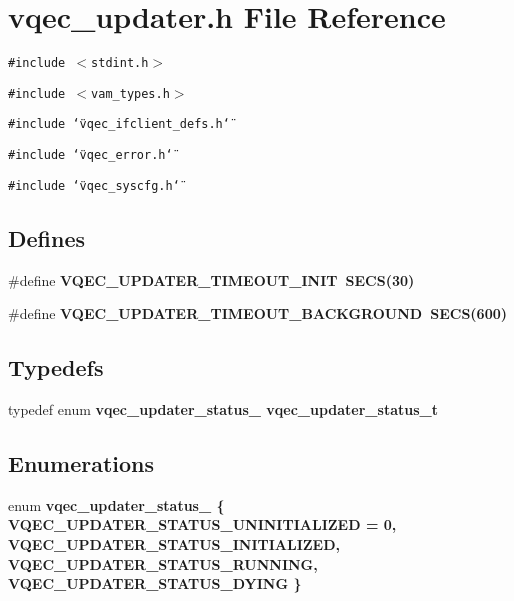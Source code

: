 \section{vqec\_\-updater.h File Reference}
\label{vqec__updater_8h}
{\tt \#include $<$stdint.h$>$}\par
{\tt \#include $<$vam\_\-types.h$>$}\par
{\tt \#include \char`\"{}vqec\_\-ifclient\_\-defs.h\char`\"{}}\par
{\tt \#include \char`\"{}vqec\_\-error.h\char`\"{}}\par
{\tt \#include \char`\"{}vqec\_\-syscfg.h\char`\"{}}\par
\subsection*{Defines}
\begin{CompactItemize}
\item 
\#define \bf{VQEC\_\-UPDATER\_\-TIMEOUT\_\-INIT}~SECS(30)
\item 
\#define \bf{VQEC\_\-UPDATER\_\-TIMEOUT\_\-BACKGROUND}~SECS(600)
\end{CompactItemize}
\subsection*{Typedefs}
\begin{CompactItemize}
\item 
typedef enum \bf{vqec\_\-updater\_\-status\_\-} \bf{vqec\_\-updater\_\-status\_\-t}
\end{CompactItemize}
\subsection*{Enumerations}
\begin{CompactItemize}
\item 
enum \bf{vqec\_\-updater\_\-status\_\-} \{ \bf{VQEC\_\-UPDATER\_\-STATUS\_\-UNINITIALIZED} =  0, 
\bf{VQEC\_\-UPDATER\_\-STATUS\_\-INITIALIZED}, 
\bf{VQEC\_\-UPDATER\_\-STATUS\_\-RUNNING}, 
\bf{VQEC\_\-UPDATER\_\-STATUS\_\-DYING}
 \}
\end{CompactItemize}
